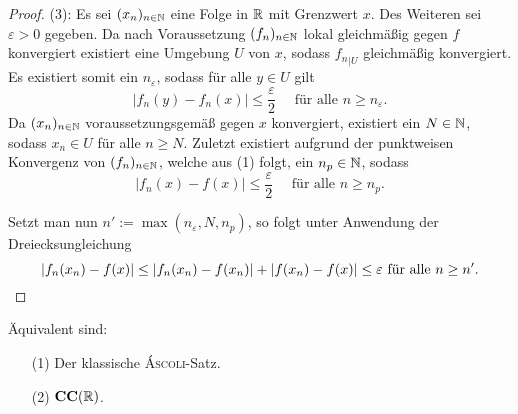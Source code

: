 \begin{proof}
  (3): 
  Es sei $(x_n)_{n \in \mathbb{N}}$ eine Folge in $\mathbb{R}$ mit Grenzwert $x$.
  Des Weiteren sei $\varepsilon > 0$ gegeben.
  Da nach Voraussetzung $(f_n)_{n \in \mathbb{N}}$ lokal gleichmäßig gegen $f$ konvergiert existiert eine Umgebung $U$ von $x$, sodass ${f_n}_{| U}$ gleichmäßig konvergiert.
  Es existiert somit ein $n_\varepsilon$, sodass für alle $y \in U$ gilt 
  \begin{displaymath}
    | f_n(y) - f_n(x) | \leq \frac{\varepsilon}{2} \quad \text{ für alle $n \geq n_\varepsilon$}.
  \end{displaymath}
  Da $(x_n)_{n \in \mathbb{N}}$ voraussetzungsgemäß gegen $x$ konvergiert, existiert ein $N \in \mathbb{N}$, sodass $x_n \in U$ für alle $n \geq N$.
  Zuletzt existiert aufgrund der punktweisen Konvergenz von $(f_n)_{n \in \mathbb{N}}$, welche aus (1) folgt, ein $n_p \in \mathbb{N}$, sodass
  \begin{displaymath}
    | f_n(x) - f(x) | \leq \frac{\varepsilon}{2} \quad \text{ für alle $n \geq n_p$}.
  \end{displaymath}

  Setzt man nun $n':= \max(n_\varepsilon, N, n_p)$, so folgt unter Anwendung der Dreiecksungleichung
  \begin{displaymath}
    | f_n(x_n) - f(x) |
    \leq
    | f_n(x_n) - f(x_n) | + | f(x_n) - f(x) | 
    \leq \varepsilon \text{ für alle $n \geq n'$}. \qedhere
  \end{displaymath}

\end{proof}

\begin{thm}
  \label{thm:classicalascoli}
  Äquivalent sind:
  \begin{enumerate}
    \item[(1)] Der klassische \textsc{Áscoli}-Satz.
    \item[(2)] $\mathbf{CC}(\mathbb{R})$.
  \end{enumerate}
\end{thm}

